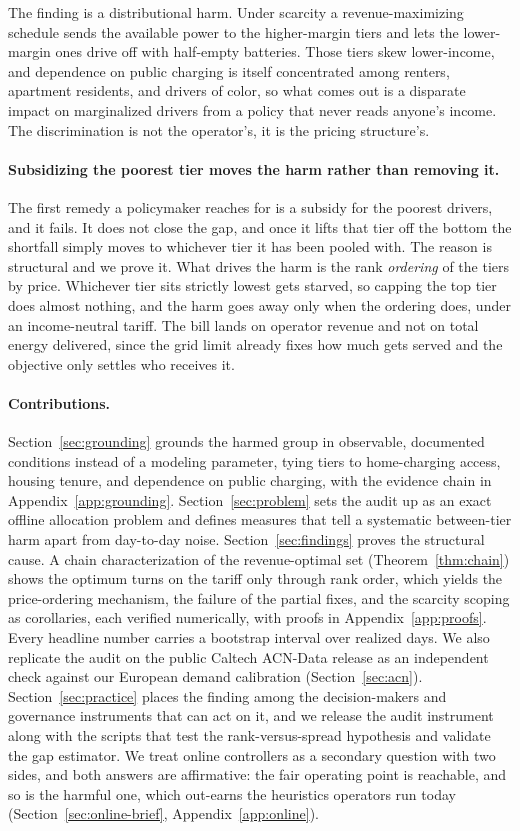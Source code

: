 \documentclass[manuscript, screen, review, anonymous]{acmart}
\begin{document}
The finding is a distributional harm. Under scarcity a revenue-maximizing schedule sends the available power to the higher-margin tiers and lets the lower-margin ones drive off with half-empty batteries. Those tiers skew lower-income, and dependence on public charging is itself concentrated among renters, apartment residents, and drivers of color, so what comes out is a disparate impact on marginalized drivers from a policy that never reads anyone's income. The discrimination is not the operator's, it is the pricing structure's.

\paragraph{Subsidizing the poorest tier moves the harm rather than removing it.}
The first remedy a policymaker reaches for is a subsidy for the poorest drivers, and it fails. It does not close the gap, and once it lifts that tier off the bottom the shortfall simply moves to whichever tier it has been pooled with. The reason is structural and we prove it. What drives the harm is the rank \emph{ordering} of the tiers by price. Whichever tier sits strictly lowest gets starved, so capping the top tier does almost nothing, and the harm goes away only when the ordering does, under an income-neutral tariff. The bill lands on operator revenue and not on total energy delivered, since the grid limit already fixes how much gets served and the objective only settles who receives it.

\paragraph{Contributions.}
Section~\ref{sec:grounding} grounds the harmed group in observable, documented conditions instead of a modeling parameter, tying tiers to home-charging access, housing tenure, and dependence on public charging, with the evidence chain in Appendix~\ref{app:grounding}. Section~\ref{sec:problem} sets the audit up as an exact offline allocation problem and defines measures that tell a systematic between-tier harm apart from day-to-day noise. Section~\ref{sec:findings} proves the structural cause. A chain characterization of the revenue-optimal set (Theorem~\ref{thm:chain}) shows the optimum turns on the tariff only through rank order, which yields the price-ordering mechanism, the failure of the partial fixes, and the scarcity scoping as corollaries, each verified numerically, with proofs in Appendix~\ref{app:proofs}. Every headline number carries a bootstrap interval over realized days. We also replicate the audit on the public Caltech ACN-Data \cite{lee2019acn} release as an independent check against our European demand calibration (Section~\ref{sec:acn}). Section~\ref{sec:practice} places the finding among the decision-makers and governance instruments that can act on it, and we release the audit instrument along with the scripts that test the rank-versus-spread hypothesis and validate the gap estimator. We treat online controllers as a secondary question with two sides, and both answers are affirmative: the fair operating point is reachable, and so is the harmful one, which out-earns the heuristics operators run today (Section~\ref{sec:online-brief}, Appendix~\ref{app:online}).
\end{document}
